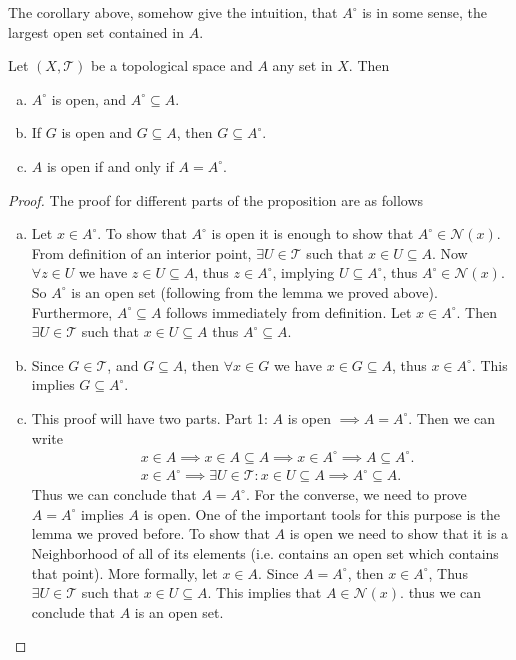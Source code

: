 The corollary above, somehow give the intuition, that $A^\circ$ is in some sense, the largest open set contained in $A$.


\begin{proposition}
	Let $(X,\mathcal{T})$ be a topological space and $A$ any set in $X$. Then 
	\begin{enumerate}[(a)]
		\item $A^\circ$ is open, and $A^\circ \subseteq A$.
		\item If $G$ is open and $G \subseteq A$, then $G \subseteq A^\circ$.
		\item $A$ is open if and only if $A = A^\circ$.
	\end{enumerate}
\end{proposition}
\begin{proof}
	The proof for different parts of the proposition are as follows
	\begin{enumerate}[(a)]
		\item Let $x\in A^\circ$. To show that $A^\circ$ is open it is enough to show that $A^\circ \in \mathcal{N}(x)$. From definition of an interior point, $\exists U \in \mathcal{T}$ such that $x\in U \subseteq A$. Now $\forall z\in U$ we have $z\in U \subseteq A$, thus $z\in A^\circ$, implying $U\subseteq A^\circ$, thus $A^\circ \in \mathcal{N}(x)$. So $A^\circ$ is an open set (following from the lemma we proved above). Furthermore, $A^\circ \subseteq A$ follows immediately from definition. Let $x\in A^\circ$. Then $\exists U \in \mathcal{T}$ such that $x \in U \subseteq A$ thus $A^\circ \subseteq A$.
		\item Since $G \in \mathcal{T}$, and $G\subseteq A$, then $\forall x\in G$ we have $x\in G \subseteq A$, thus $x \in A^\circ$. This implies $G \subseteq A^\circ$.
		
		\item This proof will have two parts. Part 1: $A$ is open $\implies A = A^\circ$. Then we can write
		\begin{align*}
			& x \in A \implies x \in A \subseteq A \implies x \in A^\circ \implies A \subseteq A^\circ. \\
			& x \in A^\circ \implies \exists U \in \mathcal{T}: x \in U \subseteq A \implies A^\circ \subseteq A.
		\end{align*} 
		Thus we can conclude that $A = A^\circ$. For the converse, we need to prove $A=A^\circ$ implies $A$ is open. One of the important tools for this purpose is the lemma we proved before. To show that $A$ is open we need to show that it is a Neighborhood of all of its elements (i.e. contains an open set which contains that point). More formally, let $x\in A$. Since $A = A^\circ$, then $x \in A^\circ$, Thus $\exists U \in \mathcal{T}$ such that $x \in U \subseteq A$. This implies that $A \in \mathcal{N}(x)$. thus we can conclude that $A$ is an open set.
	\end{enumerate}
\end{proof}


